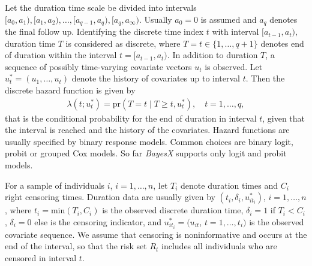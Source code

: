 Let the duration time scale be divided into intervals $\lbrack
a_{0},a_{1}),\lbrack a_{1},a_{2}),\ldots, \lbrack a_{q-1},a_{q}),
\lbrack a_{q},a_{\infty}).$ Usually $a_{0}=0$ is assumed and
$a_{q}$ denotes the final follow up. Identifying the discrete time
index $t$ with interval $\lbrack a_{t-1},a_{t}),$ duration time
$T$ is considered as discrete, where $T=t\in \{1,\ldots,q+1\}$
denotes end of duration within the interval $t=\lbrack
a_{t-1},a_{t}).$ In addition to duration $T$, a sequence of
possibly time-varying covariate vectors $u_t$ is observed. Let
$u_t^*=(u_{1},\ldots,u_{t})$ denote the history of covariates up
to interval $t$. Then the discrete hazard function is given by
\begin{eqnarray*}
\lambda(t;u_t^*)=\mbox{pr}(T=t\mid T \geq t,u_t^*), \quad
t=1,\ldots,q,
\end{eqnarray*}
that is the conditional probability for the end of duration in
interval $t$, given that the interval is reached and the history
of the covariates. Hazard functions are usually specified by
binary response models. Common choices are binary logit, probit or
grouped Cox models. So far {\em BayesX} supports only logit and
probit models.

For a sample of individuals $i$, $i=1,\ldots,n$, let $T_{i}$
denote duration times and $C_{i}$ right censoring times. Duration
data are usually given by $(t_{i},\delta_{i},u_{it_{i}}^*)$, $i =
1,\ldots,n$, where $t_{i}=\mbox{min}(T_{i},C_{i})$ is the observed
discrete duration time, $\delta_{i}=1$ if $T_{i}<C_{i}$,
$\delta_{i}=0$ else is the censoring indicator, and
$u_{it_{i}}^*=(u_{it}$, $t=1,\ldots,t_{i})$ is the observed
covariate sequence. We assume that censoring is noninformative and
occurs at the end of the interval, so that the risk set $R_{t}$
includes all individuals who are censored in interval $t$.

